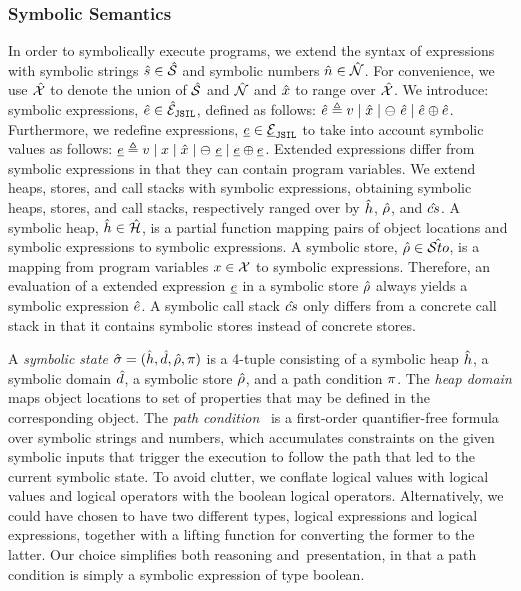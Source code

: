
\subsubsection{Symbolic Semantics}
In order to symbolically execute \jsil programs, we extend the syntax of \jsil expressions with 
symbolic strings $\hat{s} \in \hat{\mathcal{S}}$ and symbolic numbers $\hat{n} \in \hat{\mathcal{N}}$. 
For convenience, we use $\hat{\mathcal{X}}$ to denote the union of $\hat{\mathcal{S}}$ and $\hat{\mathcal{N}}$ 
and $\hat{x}$ to range over $\hat{\mathcal{X}}$. We introduce: \jsil symbolic expressions, $\hat{e} \in \hat{\mathcal{E}}_{\mathtt{JSIL}}$, defined as follows: $\hat{e} \triangleq v \mid \hat{x} \mid \ominus\ \hat{e} \mid \hat{e} \oplus \hat{e}$. 
Furthermore, we redefine \jsil expressions, $\underline{e} \in \underline{{\mathcal{E}}}_{\mathtt{JSIL}}$ to take into account symbolic values
 as follows: $\underline{e} \triangleq v \mid x \mid \hat{x} \mid \ominus\ \underline{e} \mid \underline{e} \oplus \underline{e}$.
Extended \jsil expressions differ from symbolic expressions in that they can contain program variables.
We extend heaps, stores, and call stacks with symbolic expressions, obtaining symbolic 
heaps, stores, and call stacks, respectively ranged over by $\hat{h}$, $\hat\rho$, and $\hat{cs}$.
A symbolic heap, $\hat{h} \in \hat{\mathcal H}$, is a partial function mapping pairs of  
object locations and symbolic expressions to symbolic expressions. 
A symbolic store, $\hat\rho \in \hat{{\mathcal S}to}$, is a mapping from program variables 
$x \in \mathcal{X}$ to symbolic expressions. Therefore, an evaluation of a \jsil extended expression $\underline{e}$ in a symbolic store $\hat\rho$ always yields a 
symbolic expression $\hat{e}$.
A symbolic call stack $\hat{cs}$ only differs from a concrete call stack in that it contains 
symbolic stores instead of concrete stores.


A \emph{symbolic state} $\hat{\sigma} = (\hat{h}, \hat{d}, \hat\rho, \pi)$ is a 4-tuple consisting of a 
symbolic heap $\hat{h}$, a symbolic domain $\hat{d}$, a symbolic store $\hat\rho$, and a path condition $\pi$. 
The \emph{heap domain} maps object locations to set of properties that may be defined in the corresponding object.  
The \emph{path condition}~\cite{symb:exec:survey} is a first-order quantifier-free formula over symbolic strings and 
numbers, which accumulates constraints on the given symbolic inputs that trigger 
the execution to follow the path that led to the current symbolic state.
To avoid clutter, we conflate logical values with \jsil logical values and \jsil logical 
operators with the boolean logical operators. Alternatively, we could have chosen to 
have two different types, \jsil logical expressions and logical expressions, together with a lifting 
function for converting the former to the latter. Our choice simplifies both reasoning 
and~presentation, in that a path condition is simply a \jsil symbolic expression of type boolean. 

